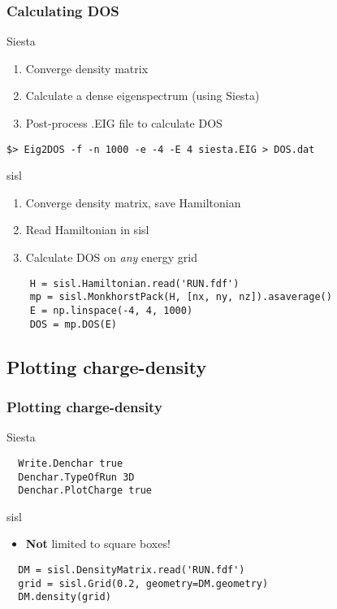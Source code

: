 \begin{frame}[fragile]
  \frametitle{Calculating DOS}

  \begin{block}{Siesta}
    \begin{enumerate}
      \item Converge density matrix
      \item Calculate a dense eigenspectrum (using Siesta)
      \item Post-process .EIG file to calculate DOS
    \end{enumerate}
\begin{verbatim}
$> Eig2DOS -f -n 1000 -e -4 -E 4 siesta.EIG > DOS.dat
\end{verbatim}
    
  \end{block}

  \begin{block}{sisl}
    \begin{enumerate}
      \item Converge density matrix, save Hamiltonian
      \item Read Hamiltonian in sisl
      \item Calculate DOS on \emph{any} energy grid
    \end{enumerate}

\begin{verbatim}
    H = sisl.Hamiltonian.read('RUN.fdf')
    mp = sisl.MonkhorstPack(H, [nx, ny, nz]).asaverage()
    E = np.linspace(-4, 4, 1000)
    DOS = mp.DOS(E)
\end{verbatim}
  \end{block}
  
\end{frame}


\subsection{Plotting charge-density}

\begin{frame}[fragile]
  \frametitle{Plotting charge-density}

  \begin{block}{Siesta}
\begin{verbatim}
  Write.Denchar true
  Denchar.TypeOfRun 3D
  Denchar.PlotCharge true
\end{verbatim}
    
  \end{block}

  \begin{block}{sisl}

    \begin{itemize}
      \item \textbf{Not} limited to square boxes!
    \end{itemize}

\begin{verbatim}
  DM = sisl.DensityMatrix.read('RUN.fdf')
  grid = sisl.Grid(0.2, geometry=DM.geometry)
  DM.density(grid)
\end{verbatim}
  \end{block}
  
\end{frame}


